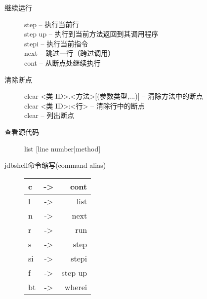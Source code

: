 \documentclass[a4paper,titlepage]{article}
\begin{document}
\begin{description}
    \item [继续运行]
        step – 执行当前行\\
        step up – 执行到当前方法返回到其调用程序\\
        stepi – 执行当前指令\\
        next – 跳过一行（跨过调用）\\
        cont – 从断点处继续执行

    \item [清除断点]
        clear <类 ID>.<方法>[(参数类型,...)]     – 清除方法中的断点\\
        clear <类 ID>:<行>                       – 清除行中的断点\\
        clear – 列出断点

    \item [查看源代码] 
        list [line number|method]

    \item [jdbshell命令缩写(command alias)]
            \begin{tabular}{|lcr|}\hline
                c &->& cont\\\hline
                l &->& list\\\hline
                n &->& next\\\hline
                r &->& run\\\hline
                s &->& step\\\hline
                si &->& stepi\\\hline
                f &->& step up\\\hline
                bt &->& wherei\\\hline
            \end{tabular}

\end{description}
\end{document}
